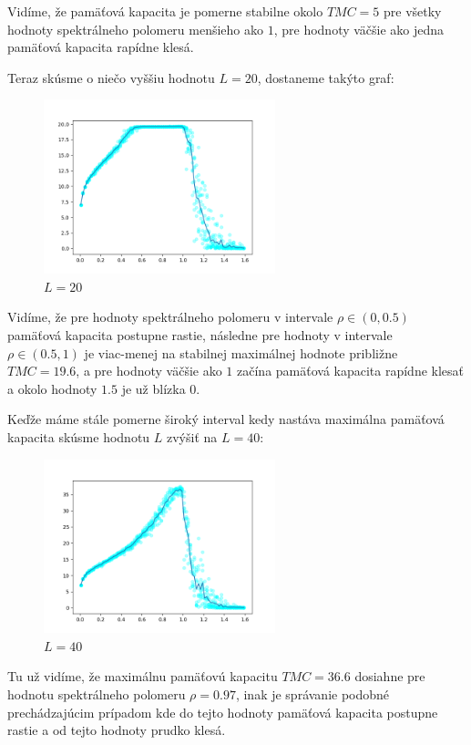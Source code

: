 \documentclass[a4paper]{article}
\begin{document}
	Vidíme, že pamäťová kapacita je pomerne stabilne okolo $TMC=5$ pre všetky hodnoty spektrálneho polomeru menšieho ako $1$, pre hodnoty väčšie ako jedna pamäťová kapacita rapídne klesá. 
	
	Teraz skúsme o niečo vyššiu hodnotu $L=20$, dostaneme takýto graf:
	
	\begin{figure}[!h]
		\centering
		\includegraphics[width=0.6\textwidth]{../L_20.png}
		\caption{$L=20$}
	\end{figure}

	Vidíme, že pre hodnoty spektrálneho polomeru v intervale $\rho \in (0, 0.5)$ pamäťová kapacita postupne rastie, následne pre hodnoty v intervale $\rho \in(0.5, 1)$ je viac-menej na stabilnej maximálnej hodnote približne $TMC=19.6$, a pre hodnoty väčšie ako $1$ začína pamäťová kapacita rapídne klesať a okolo hodnoty $1.5$ je už blízka $0$.
	\newpage
	
	Keďže máme stále pomerne široký interval kedy nastáva maximálna pamäťová kapacita skúsme hodnotu $L$ zvýšiť na $L=40$:
	
	\begin{figure}[!h]
		\centering
		\includegraphics[width=0.6\textwidth]{../L_40.png}
		\caption{$L=40$}
	\end{figure}

	Tu už vidíme, že maximálnu pamäťovú kapacitu $TMC=36.6$ dosiahne pre hodnotu spektrálneho polomeru $\rho=0.97$, inak je správanie podobné prechádzajúcim prípadom kde do tejto hodnoty pamäťová kapacita postupne rastie a od tejto hodnoty prudko klesá.
	\\
	
\end{document}
